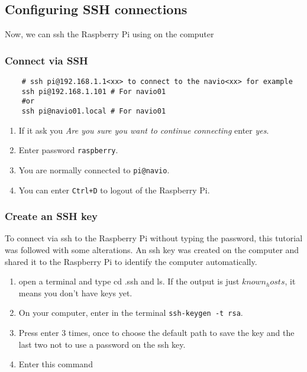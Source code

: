 \subsection{Configuring SSH connections}
Now, we can ssh the Raspberry Pi using on the computer
\subsubsection{Connect via SSH}

\begin{verbatim}
    # ssh pi@192.168.1.1<xx> to connect to the navio<xx> for example
    ssh pi@192.168.1.101 # For navio01
    #or
    ssh pi@navio01.local # For navio01

                \end{verbatim}

\begin{enumerate}
    \item If it ask you \emph{Are you sure you want to continue connecting} enter \emph{yes}.
    \item Enter password \texttt{raspberry}.
    \item You are normally connected to \texttt{pi@navio}.
    \item You can enter \texttt{Ctrl+D} to logout of the Raspberry Pi.
\end{enumerate}

\subsubsection{Create an SSH key}
To connect via ssh to the Raspberry Pi without typing the password, this tutorial \cite{ssh_ssh_copy_id} was followed with some alterations. An ssh key was created on the computer and shared it to the Raspberry Pi to identify the computer automatically.

\begin{enumerate}
    \item open a terminal and type cd .ssh and ls. If the output is just $known_hosts$, it means you don't have keys yet.
    \item On your computer, enter in the terminal \texttt{ssh-keygen -t rsa}.
    \item Press enter 3 times, once to choose the default path to save the key and the last two not to use a password on the ssh key.
    \item Enter this command
\end{enumerate}

